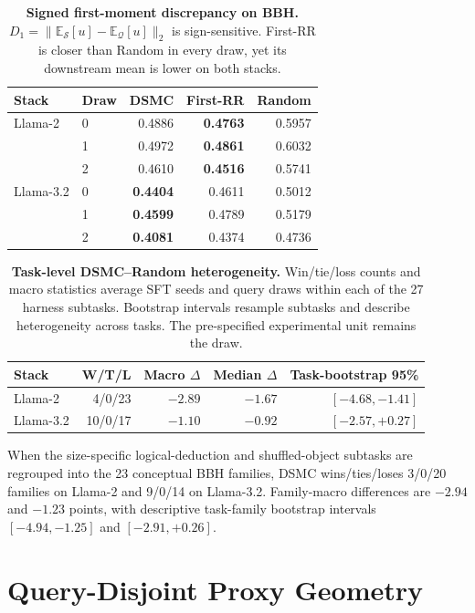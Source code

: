 \documentclass{article}
\newcommand{\method}{\textsc{DSMC}}
\begin{document}
\begin{table}[h]
\caption{\textbf{Signed first-moment discrepancy on BBH.}
$D_1=\|\mathbb E_{\mathcal S}[u]-\mathbb E_{\mathcal Q}[u]\|_2$ is
sign-sensitive. First-RR is closer than Random in every draw, yet its
downstream mean is lower on both stacks.}
\label{tab:signed_d1}
\centering
\small
\begin{tabular}{llrrr}
\toprule
Stack & Draw & \method{} & First-RR & Random \\
\midrule
Llama-2 & 0 & 0.4886 & \textbf{0.4763} & 0.5957 \\
        & 1 & 0.4972 & \textbf{0.4861} & 0.6032 \\
        & 2 & 0.4610 & \textbf{0.4516} & 0.5741 \\
\midrule
Llama-3.2 & 0 & \textbf{0.4404} & 0.4611 & 0.5012 \\
          & 1 & \textbf{0.4599} & 0.4789 & 0.5179 \\
          & 2 & \textbf{0.4081} & 0.4374 & 0.4736 \\
\bottomrule
\end{tabular}
\end{table}

\begin{table}[h]
\caption{\textbf{Task-level DSMC--Random heterogeneity.}
Win/tie/loss counts and macro statistics average SFT seeds and query draws
within each of the 27 harness subtasks. Bootstrap intervals resample subtasks
and describe heterogeneity across tasks. The pre-specified experimental unit
remains the draw.}
\label{tab:taskwise}
\centering
\small
\begin{tabular}{lrrrr}
\toprule
Stack & W/T/L & Macro $\Delta$ & Median $\Delta$ & Task-bootstrap 95\% \\
\midrule
Llama-2 & 4/0/23 & $-2.89$ & $-1.67$ & $[-4.68,-1.41]$ \\
Llama-3.2 & 10/0/17 & $-1.10$ & $-0.92$ & $[-2.57,+0.27]$ \\
\bottomrule
\end{tabular}
\end{table}

When the size-specific logical-deduction and shuffled-object subtasks are
regrouped into the 23 conceptual BBH families, \method{} wins/ties/loses
3/0/20 families on Llama-2 and 9/0/14 on Llama-3.2. Family-macro differences
are $-2.94$ and $-1.23$ points, with descriptive task-family bootstrap
intervals $[-4.94,-1.25]$ and $[-2.91,+0.26]$.

\section{Query-Disjoint Proxy Geometry}
\label{app:proxy_geometry}
\end{document}
